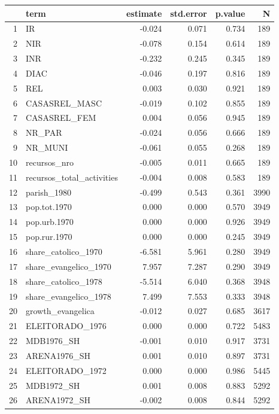 \begin{table}[ht]
\centering
\begin{tabular}{rlrrrr}
  \hline
 & term & estimate & std.error & p.value & N \\ 
  \hline
1 & IR & -0.024 & 0.071 & 0.734 &  189 \\ 
  2 & NIR & -0.078 & 0.154 & 0.614 &  189 \\ 
  3 & INR & -0.232 & 0.245 & 0.345 &  189 \\ 
  4 & DIAC & -0.046 & 0.197 & 0.816 &  189 \\ 
  5 & REL & 0.003 & 0.030 & 0.921 &  189 \\ 
  6 & CASASREL\_MASC & -0.019 & 0.102 & 0.855 &  189 \\ 
  7 & CASASREL\_FEM & 0.004 & 0.056 & 0.945 &  189 \\ 
  8 & NR\_PAR & -0.024 & 0.056 & 0.666 &  189 \\ 
  9 & NR\_MUNI & -0.061 & 0.055 & 0.268 &  189 \\ 
  10 & recursos\_nro & -0.005 & 0.011 & 0.665 &  189 \\ 
  11 & recursos\_total\_activities & -0.004 & 0.008 & 0.583 &  189 \\ 
  12 & parish\_1980 & -0.499 & 0.543 & 0.361 & 3990 \\ 
  13 & pop.tot.1970 & 0.000 & 0.000 & 0.570 & 3949 \\ 
  14 & pop.urb.1970 & 0.000 & 0.000 & 0.926 & 3949 \\ 
  15 & pop.rur.1970 & 0.000 & 0.000 & 0.245 & 3949 \\ 
  16 & share\_catolico\_1970 & -6.581 & 5.961 & 0.280 & 3949 \\ 
  17 & share\_evangelico\_1970 & 7.957 & 7.287 & 0.290 & 3949 \\ 
  18 & share\_catolico\_1978 & -5.514 & 6.040 & 0.368 & 3948 \\ 
  19 & share\_evangelico\_1978 & 7.499 & 7.553 & 0.333 & 3948 \\ 
  20 & growth\_evangelica & -0.012 & 0.027 & 0.685 & 3617 \\ 
  21 & ELEITORADO\_1976 & 0.000 & 0.000 & 0.722 & 5483 \\ 
  22 & MDB1976\_SH & -0.001 & 0.010 & 0.917 & 3731 \\ 
  23 & ARENA1976\_SH & 0.001 & 0.010 & 0.897 & 3731 \\ 
  24 & ELEITORADO\_1972 & 0.000 & 0.000 & 0.986 & 5445 \\ 
  25 & MDB1972\_SH & 0.001 & 0.008 & 0.883 & 5292 \\ 
  26 & ARENA1972\_SH & -0.002 & 0.008 & 0.844 & 5292 \\ 
   \hline
\end{tabular}
\end{table}
